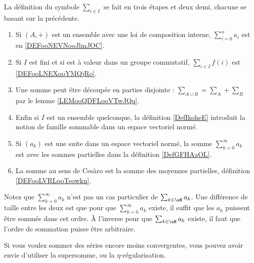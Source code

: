           \label{THEMEooMKLBooLGFCdx}
La définition du symbole \( \sum_{i\in I}\) se fait en trois étapes et deux demi, chacune se basant sur la précédente.
\begin{enumerate}
	\item
	      Si \( (A,+)\) est un ensemble avec une loi de composition interne, \( \sum_{i=0}^na_i\) est en \ref{DEFooNEVNooJlmJOC}.
	\item
	      Si \( I\) est fini et si est à valeur dans un groupe commutatif, \( \sum_{i\in I}f(i)\) est \ref{DEFooLNEXooYMQjRo}.
	\item
	      Une somme peut être découpée en parties disjointe : \( \sum_{A\cup B}=\sum_A+\sum_B\) par le lemme \ref{LEMooQDFLooVTwJQq}.
	\item
	      Enfin si \( I\) est un ensemble quelconque, la définition \ref{DefIkoheE} introduit la notion de famille sommable dans un espace vectoriel normé.
	\item
	      Si \( (a_k)\) est une suite dans un espace vectoriel normé, la somme \( \sum_{k=0}^{\infty}a_k\) est avec les sommes partielles dans la définition \ref{DefGFHAaOL}.
	\item
	      La somme au sens de Cesàro est la somme des moyennes partielles, définition \ref{DEFooLVRLooTeowkn}.
\end{enumerate}
Notez que \( \sum_{k=0}^{\infty}a_k\) n'est pas un cas particulier de \( \sum_{k\in \eN}a_k\). Une différence de taille entre les deux est que pour que \( \sum_{k=0}^{\infty}a_k\) existe, il suffit que les \( a_k\) puissent être sommés dans cet ordre. À l'inverse pour que \( \sum_{k\in \eN}a_k\) existe, il faut que l'ordre de sommation puisse être arbitraire.

Si vous voulez sommer des séries encore moins convergentes, vous pouvez avoir envie d'utiliser la supersomme\cite{BIBooUCSPooNKNWEK}, ou la \( \eta\)-régularisation\cite{BIBooLFLMooHFZFHu}.

